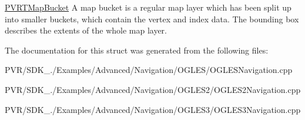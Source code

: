   \hyperlink{struct_p_v_r_t_map_bucket}{P\+V\+R\+T\+Map\+Bucket}  A map bucket is a regular map layer which has been split up into smaller buckets, which contain the vertex and index data. The bounding box describes the extents of the whole map layer. 

The documentation for this struct was generated from the following files\+:\begin{DoxyCompactItemize}
\item 
P\+V\+R/\+S\+D\+K\+\_./\+Examples/\+Advanced/\+Navigation/\+O\+G\+L\+E\+S/O\+G\+L\+E\+S\+Navigation.\+cpp\item 
P\+V\+R/\+S\+D\+K\+\_./\+Examples/\+Advanced/\+Navigation/\+O\+G\+L\+E\+S2/O\+G\+L\+E\+S2\+Navigation.\+cpp\item 
P\+V\+R/\+S\+D\+K\+\_./\+Examples/\+Advanced/\+Navigation/\+O\+G\+L\+E\+S3/O\+G\+L\+E\+S3\+Navigation.\+cpp\end{DoxyCompactItemize}
